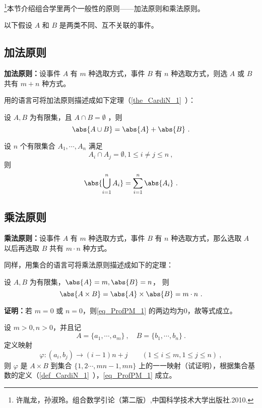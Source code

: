 
\footnote{许胤龙，孙淑玲。组合数学引论（第二版）,中国科学技术大学出版社.2010.}本节介绍组合学里两个一般性的原则——加法原则和乘法原则。

以下假设 $A$ 和 $B$ 是两类不同、互不关联的事件。
\subsection{加法原则}
\textbf{加法原则：}设事件 $A$ 有 $m$ 种选取方式，事件 $B$ 有 $n$ 种选取方式，则选 $A$ 或 $B$ 共有 $m+n$ 种方式。

用的语言可将加法原则描述成如下定理（\autoref{the_CardiN_1}~）：
\begin{theorem}{}
设 $A,B$ 为有限集，且 $A\cap B=\emptyset$ ，则
\begin{equation}
\abs{A\cup B}=\abs{A}+\abs{B}~.
\end{equation}
\end{theorem}
\begin{corollary}{}
设 $n$ 个有限集合 $A_1,\cdots,A_n$ 满足
\begin{equation}
A_i\cap A_j=\emptyset,1\leq i\neq j\leq n~,
\end{equation}
则
\begin{equation}
\abs{\bigcup_{i=1}^n A_i}=\sum_{i=1}^n\abs{A_i}~.
\end{equation}

\end{corollary}
\subsection{乘法原则}\label{sub_ProfPM_1}
\textbf{乘法原则：}设事件 $A$ 有 $m$ 种选取方式，事件 $B$ 有 $n$ 种选取方式，那么选取 $A$ 以后再选取 $B$ 共有 $m\cdot n$ 种方式。

同样，用集合的语言可将乘法原则描述成如下的定理：
\begin{theorem}{}\label{the_ProfPM_1}
设 $A,B$ 为有限集，$\abs{A}=m,\abs{B}=n$， 则
\begin{equation}\label{eq_ProfPM_1}
\abs{A\times B}=\abs{A}\times\abs{B}=m\cdot n~.
\end{equation}
\end{theorem}
\textbf{证明：}若 $m=0$ 或 $n=0$，则\autoref{eq_ProfPM_1} 的两边均为0，故等式成立。

设 $m>0,n>0$，并且记
\begin{equation}
A=\{a_1,\cdots,a_m\}~,\quad B=\{b_1,\cdots,b_n\}~.
\end{equation}
定义映射
\begin{equation}
\varphi:(a_i,b_j)\rightarrow (i-1)n+j\qquad (1\leq i\leq m,1\leq j\leq n)~,
\end{equation}
则 $\varphi$ 是 $A\times B$ 到集合 $\{1,2\cdots,mn-1,mn\}$ 上的一一映射（试证明），根据集合基数的定义（\autoref{def_CardiN_1}~），\autoref{eq_ProfPM_1} 成立。


